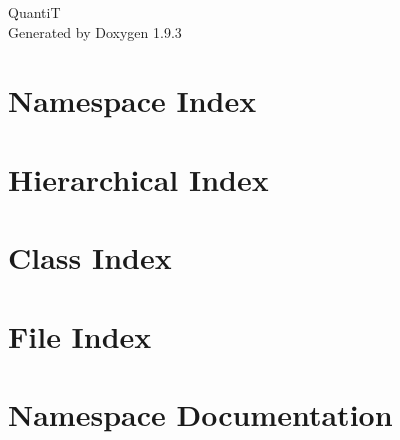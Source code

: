 \documentclass[twoside]{book}
\newcommand{\+}{\discretionary{\mbox{\scriptsize$\hookleftarrow$}}{}{}}
\newcommand{\clearemptydoublepage}{%
    \newpage{\pagestyle{empty}\cleardoublepage}%
  }
\begin{document}
  \raggedbottom
    \hypersetup{pageanchor=false,
                bookmarksnumbered=true,
                pdfencoding=unicode
               }
  \begin{titlepage}
  \vspace*{7cm}
  \begin{center}%
  {\Large QuantiT}\\
  \vspace*{1cm}
  {\large Generated by Doxygen 1.9.3}\\
  \end{center}
  \end{titlepage}
  \clearemptydoublepage
  \tableofcontents
  \clearemptydoublepage
  \hypersetup{pageanchor=true}
\chapter{Namespace Index}

\chapter{Hierarchical Index}

\chapter{Class Index}

\chapter{File Index}

\chapter{Namespace Documentation}

\end{document}
